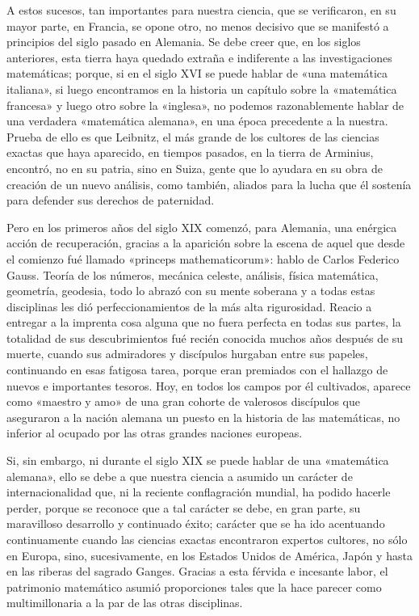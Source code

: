 \documentclass[a4paper, 12pt, draft]{article}
\begin{document}
{{%

A estos sucesos, tan importantes para nuestra ciencia, que se verificaron, en su mayor parte, en Francia, se opone otro, no menos decisivo que se manifestó a principios del siglo pasado en Alemania. 
Se debe creer que, en los siglos anteriores, esta tierra haya quedado extraña e indiferente a las investigaciones matemáticas; porque, si en el siglo XVI se puede hablar de «una matemática italiana», si luego encontramos en la historia un capítulo sobre la «matemática francesa» y luego otro sobre la «inglesa», no podemos razonablemente hablar de una verdadera «matemática alemana», en una época precedente a la nuestra. Prueba de ello es que Leibnitz, el más grande de los cultores de las ciencias exactas que haya aparecido, en tiempos pasados, en la tierra de Arminius, encontró, no en su patria, sino en Suiza, gente que lo ayudara en su obra de creación de un nuevo análisis, como también, aliados para la lucha que él sostenía para defender sus derechos de paternidad.

Pero en los primeros años del siglo XIX comenzó, para Alemania, una enérgica acción de recuperación, gracias a la aparición sobre la escena de aquel que desde el comienzo fué llamado «princeps mathematicorum»: hablo de Carlos Federico Gauss. Teoría de los números, mecánica celeste, análisis, física matemática, geometría, geodesia, todo lo abrazó con su mente soberana y a todas estas disciplinas les dió perfeccionamientos de la más alta rigurosidad. Reacio a entregar a la imprenta cosa alguna que no fuera perfecta en todas sus partes, la totalidad de sus descubrimientos fué recién conocida muchos años después de su muerte, cuando sus admiradores y discípulos hurgaban entre sus papeles, continuando en esas fatigosa tarea, porque eran premiados con el hallazgo de nuevos e importantes tesoros. Hoy, en todos los campos por él cultivados, aparece como «maestro y amo» de una gran cohorte de valerosos discípulos que aseguraron a la nación alemana un puesto en la historia de las matemáticas, no inferior al ocupado por las otras grandes
naciones europeas.

Si, sin embargo, ni durante el siglo XIX se puede hablar de una «mate\-mática alemana», ello se debe a que nuestra ciencia a asumido un carácter de internacionalidad que, ni la reciente conflagración mundial, ha podido hacerle perder, porque se reconoce que a tal carácter se debe, en gran parte, su maravilloso desarrollo y continuado éxito; carácter que se ha ido acentuando continuamente cuando las ciencias exactas encontraron expertos cultores, no sólo en Europa, sino, sucesivamente, en los Estados Unidos de América, Japón y hasta en las riberas del sagrado Ganges. Gracias a esta férvida e incesante labor, el patrimonio matemático asumió proporciones tales que la hace parecer como multimillonaria a la par de las otras disciplinas.

}}
\end{document}
